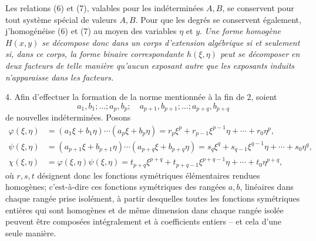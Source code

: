 \documentclass[11pt]{article}
\begin{document}
Les relations (6) et (7), valables pour les indéterminées $A,B$, se conservent pour tout système spécial de valeurs $A,B$. Pour que les degrés se conservent également, j'homogénéise (6) et (7) au moyen des variables $\eta$ et $y$. \emph{Une forme homogène $H(x,y)$ se décompose donc dans un corps d'extension algébrique si et seulement si, dans ce corps, la forme binaire correspondante $h(\xi,\eta)$ peut se décomposer en deux facteurs de telle manière qu'aucun exposant autre que les exposants induits n'apparaisse dans les facteurs.}

4. Afin d'effectuer la formation de la norme mentionnée à la fin de 2, soient
\[
 a_1,b_1;\ldots; a_p,b_p;\quad a_{p+1},b_{p+1};\ldots; a_{p+q},b_{p+q}
\]
de nouvelles indéterminées. Posons
\begin{equation}
\begin{aligned}
 \varphi(\xi,\eta)&=(a_1\xi+b_1\eta)\cdots(a_p\xi+b_p\eta)
     =r_p\xi^p+r_{p-1}\xi^{p-1}\eta+\cdots+r_0\eta^p,\\
 \psi(\xi,\eta)&=(a_{p+1}\xi+b_{p+1}\eta)\cdots(a_{p+q}\xi+b_{p+q}\eta)
     =s_q\xi^q+s_{q-1}\xi^{q-1}\eta+\cdots+s_0\eta^q,\\
 \chi(\xi,\eta)&=\varphi(\xi,\eta)\psi(\xi,\eta)
     =t_{p+q}\xi^{p+q}+t_{p+q-1}\xi^{p+q-1}\eta+\cdots+t_0\eta^{p+q},
\end{aligned}
\tag{8}
\end{equation}
où $r,s,t$ désignent donc les fonctions symétriques élémentaires rendues homogènes; c'est-à-dire ces fonctions symétriques des rangées $a,b$, linéaires dans chaque rangée prise isolément, à partir desquelles toutes les fonctions symétriques entières qui sont homogènes et de même dimension dans chaque rangée isolée peuvent être composées intégralement et à coefficients entiers -- et cela d'une seule manière.
\end{document}
